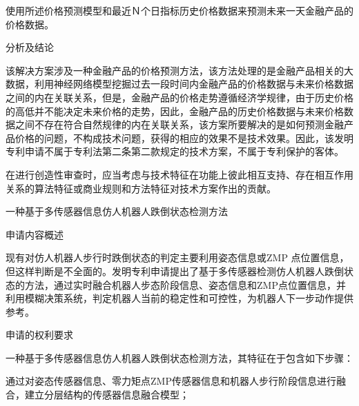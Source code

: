 {\setlength{\parindent}{20.6bp}使用所述价格预测模型和最近Ｎ个日指标历史价格数据来预测未来一天金融产品的价格数据。\par}

{\setlength{\parindent}{20.1bp}分析及结论\par}

{\setlength{\parindent}{20.6bp}该解决方案涉及一种金融产品的价格预测方法，该方法处理的是金融产品相关的大数据，利用神经网络模型挖掘过去一段时间内金融产品的价格数据与未来价格数据之间的内在关联关系，但是，金融产品的价格走势遵循经济学规律，由于历史价格的高低并不能决定未来价格的走势，因此，金融产品的历史价格数据与未来价格数据之间不存在符合自然规律的内在关联关系，该方案所要解决的是如何预测金融产品价格的问题，不构成技术问题，获得的相应的效果不是技术效果。因此，该发明专利申请不属于专利法第二条第二款规定的技术方案，不属于专利保护的客体。\par}

{\setlength{\parindent}{15.3bp}在进行创造性审查时，应当考虑与技术特征在功能上彼此相互支持、存在相互作用关系的算法特征或商业规则和方法特征对技术方案作出的贡献。\par}

{\setlength{\parindent}{15.3bp}\par}

{\setlength{\parindent}{20.6bp}一种基于多传感器信息仿人机器人跌倒状态检测方法\par}

{\setlength{\parindent}{20.1bp}申请内容概述\par}

{\setlength{\parindent}{20.6bp}现有对仿人机器人步行时跌倒状态的判定主要利用姿态信息或ZMP 点位置信息，但这样判断是不全面的。发明专利申请提出了基于多传感器检测仿人机器人跌倒状态的方法，通过实时融合机器人步态阶段信息、姿态信息和ZMP点位置信息，并利用模糊决策系统，判定机器人当前的稳定性和可控性，为机器人下一步动作提供参考。\par}

{\setlength{\parindent}{20.1bp}申请的权利要求\par}

{\setlength{\parindent}{20.6bp}一种基于多传感器信息仿人机器人跌倒状态检测方法，其特征在于包含如下步骤：\par}

{\setlength{\parindent}{15.3bp}通过对姿态传感器信息、零力矩点ZMP传感器信息和机器人步行阶段信息进行融合，建立分层结构的传感器信息融合模型；\par}

